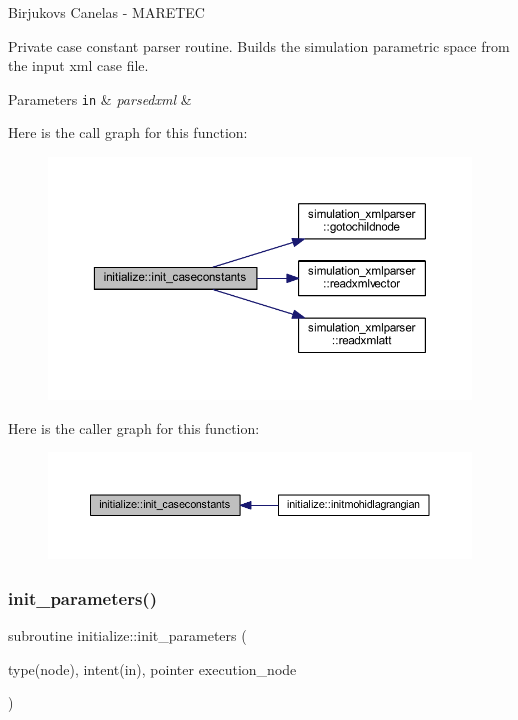 Birjukovs Canelas -\/ M\+A\+R\+E\+T\+EC 

Private case constant parser routine. Builds the simulation parametric space from the input xml case file. 
\begin{DoxyParams}[1]{Parameters}
\mbox{\tt in}  & {\em parsedxml} & \\
\hline
\end{DoxyParams}
Here is the call graph for this function\+:
\nopagebreak
\begin{figure}[H]
\begin{center}
\leavevmode
\includegraphics[width=350pt]{namespaceinitialize_a4c982b312ab10bf112dd3d2bc314569e_cgraph}
\end{center}
\end{figure}
Here is the caller graph for this function\+:
\nopagebreak
\begin{figure}[H]
\begin{center}
\leavevmode
\includegraphics[width=350pt]{namespaceinitialize_a4c982b312ab10bf112dd3d2bc314569e_icgraph}
\end{center}
\end{figure}
\mbox{\label{namespaceinitialize_a7a54dc126f448bea2b566339a449f85c}} 
\subsubsection{\texorpdfstring{init\+\_\+parameters()}{init\_parameters()}}
{\footnotesize\ttfamily subroutine initialize\+::init\+\_\+parameters (\begin{DoxyParamCaption}\item[{type(node), intent(in), pointer}]{execution\+\_\+node }\end{DoxyParamCaption})\hspace{0.3cm}{\ttfamily [private]}}




